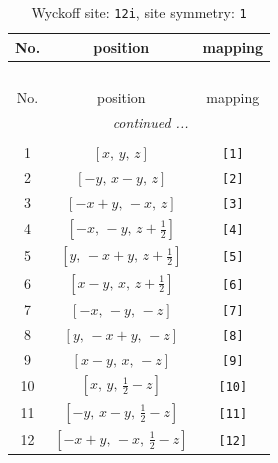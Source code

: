 \documentclass[fleqn,8pt]{jsarticle}
\begin{document}
\renewcommand{\arraystretch}{1.2}
\begin{longtable}{ccc}
\caption{Wyckoff site: {\tt 12i}, site symmetry: {\tt 1}}
 \\
 \hline \hline
No. & position & mapping \\ \hline \endfirsthead

\multicolumn{2}{l}{\tablename\ \thetable{}} \\
 \hline \hline
No. & position & mapping \\ \hline \endhead

 \hline \hline
\multicolumn{2}{r}{\footnotesize\it continued ...} \\ \endfoot

 \hline \hline
\multicolumn{2}{r}{} \\ \endlastfoot

1 & $\left[ x,\, y,\, z \right]$ & {\tt [1]} \\ \hline
2 & $\left[ - y,\, x - y,\, z \right]$ & {\tt [2]} \\ \hline
3 & $\left[ - x + y,\, - x,\, z \right]$ & {\tt [3]} \\ \hline
4 & $\left[ - x,\, - y,\, z + \frac{1}{2} \right]$ & {\tt [4]} \\ \hline
5 & $\left[ y,\, - x + y,\, z + \frac{1}{2} \right]$ & {\tt [5]} \\ \hline
6 & $\left[ x - y,\, x,\, z + \frac{1}{2} \right]$ & {\tt [6]} \\ \hline
7 & $\left[ - x,\, - y,\, - z \right]$ & {\tt [7]} \\ \hline
8 & $\left[ y,\, - x + y,\, - z \right]$ & {\tt [8]} \\ \hline
9 & $\left[ x - y,\, x,\, - z \right]$ & {\tt [9]} \\ \hline
10 & $\left[ x,\, y,\, \frac{1}{2} - z \right]$ & {\tt [10]} \\ \hline
11 & $\left[ - y,\, x - y,\, \frac{1}{2} - z \right]$ & {\tt [11]} \\ \hline
12 & $\left[ - x + y,\, - x,\, \frac{1}{2} - z \right]$ & {\tt [12]} \\
\end{longtable}
\end{document}
